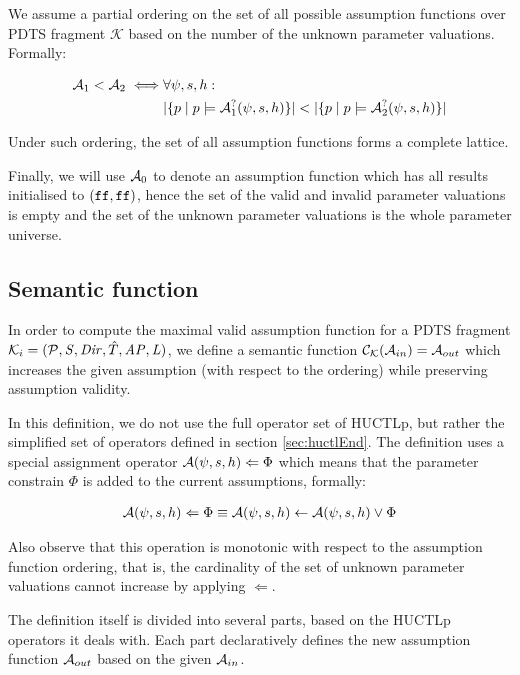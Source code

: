 We assume a partial ordering on the set of all possible assumption functions over \ac{PDTS} fragment $\mathcal{K}$ based on the number of the unknown parameter valuations. Formally:

\begin{align*}
	\mathcal{A}_1 < \mathcal{A}_2 \iff & \forall \psi, s, h : \\
	 & |\{ p \mid p \models \mathcal{A}^?_1(\psi, s, h) \}| < |\{ p \mid p \models \mathcal{A}^?_2(\psi, s, h) \}|
\end{align*}

Under such ordering, the set of all assumption functions forms a complete lattice. 

Finally, we will use $\mathcal{A}_0$ to denote an assumption function which has all results initialised to $(\texttt{ff}, \texttt{ff})$, hence the set of the valid and invalid parameter valuations is empty and the set of the unknown parameter valuations is the whole parameter universe.

\subsection{Semantic function}

In order to compute the maximal valid assumption function for a \ac{PDTS} fragment $\mathcal{K}_i = (\mathcal{P}, \mathit{S}, \mathit{Dir}, \hat{T}, \mathit{AP}, \mathit{L})$, we define a semantic function $\mathcal{C}_\mathcal{K}(\mathcal{A}_{in}) = \mathcal{A}_{out}$ which increases the given assumption (with respect to the ordering) while preserving assumption validity.

In this definition, we do not use the full operator set of \ac{HUCTLp}, but rather the simplified set of operators defined in section \ref{sec:huctlEnd}. The definition uses a special assignment operator $\mathcal{A}(\psi, s, h) \Leftarrow \Phi$ which means that the parameter constrain $\Phi$ is added to the current assumptions, formally:

\begin{align*}
	\mathcal{A}(\psi, s, h) \Leftarrow \Phi \equiv \mathcal{A}(\psi, s, h) \gets \mathcal{A}(\psi, s, h) \lor \Phi
\end{align*}

Also observe that this operation is monotonic with respect to the assumption function ordering, that is, the cardinality of the set of unknown parameter valuations cannot increase by applying $\Leftarrow$.

The definition itself is divided into several parts, based on the \ac{HUCTLp} operators it deals with. Each part declaratively defines the new assumption function $\mathcal{A}_{out}$ based on the given $\mathcal{A}_{in}$.

